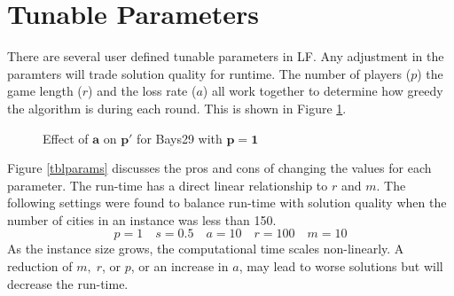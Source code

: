 \documentclass[12pt,letterpaper,oneside]{book}
\begin{document}
	\section{Tunable Parameters}
	There are several user defined tunable parameters in LF. Any adjustment in the paramters will trade solution quality for runtime. The number of players ($ p $) the game length ($ r $) and the loss rate ($ a $) all work together to determine how greedy the algorithm is during each round. This is shown in Figure \ref{figpprime}.
	\begin{figure}[H]
		\centering
	\caption{Effect of $ \boldsymbol{a} $ on $ \boldsymbol{p'} $ for Bays29 with $ \boldsymbol{p=1} $}
	\label{figpprime}
	\end{figure}
\noindent Figure \ref{tblparams} discusses the pros and cons of changing the values for each parameter. The run-time has a direct linear relationship to $ r $ and $ m $. The following settings were found to balance run-time with solution quality when the number of cities in an instance was less than 150.
 \[p=1\quad s=0.5\quad a=10\quad r=100\quad m=10\]
As the instance size grows, the computational time scales non-linearly. A reduction of $ m,\;r $, or $ p $, or an increase in $ a $, may lead to worse solutions but will decrease the run-time.
\end{document}

